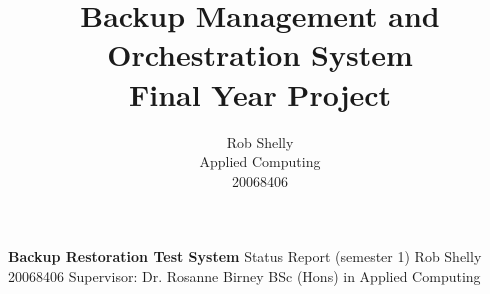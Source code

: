 \documentclass[]{article}
\title{Backup Management and Orchestration System\\
	Final Year Project}
\author{Rob Shelly\\
	Applied Computing\\
	20068406}
\begin{document}
\noindent \LARGE{\textbf{Backup Restoration Test System}}
\bigbreak
\noindent \large{Status Report (semester 1)}
\bigbreak
\noindent \Large{Rob Shelly}
\bigbreak
\noindent \Large{20068406}
\bigbreak
\noindent \Large{Supervisor: Dr. Rosanne Birney}
\bigbreak
\bigbreak
\noindent \Large{BSc (Hons) in Applied Computing}
\thispagestyle{empty}

\newpage
{}
\tableofcontents

\newpage
{}










\newpage
\renewcommand*{\bibfont}{\raggedright}


\end{document}
